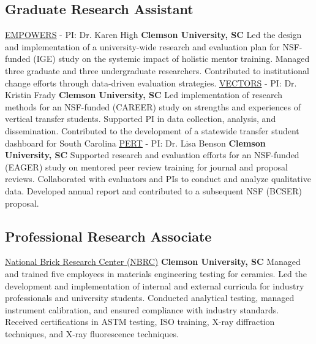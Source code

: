 
\subsection{Graduate Research Assistant}
\begin{cvtable}
        {\color{cvsectioncolor}\href{https://www.nsf.gov/awardsearch/showAward?AWD_ID=2429719&HistoricalAwards=false}{\underline{EMPOWERS}} - PI: Dr. Karen High}
        {\textbf{Clemson University, SC}}
        {Led the design and implementation of a university-wide research and evaluation plan for NSF-funded (IGE) study on the systemic impact of holistic mentor training. Managed three graduate and three undergraduate researchers. Contributed to institutional change efforts through data-driven evaluation strategies.}
        {\color{cvsectioncolor}\href{https://www.nsf.gov/awardsearch/showAward?AWD_ID=2144213&HistoricalAwards=false}{\underline{VECTORS}} - PI: Dr. Kristin Frady}
        {\textbf{Clemson University, SC}}
        {Led implementation of research methods for an NSF-funded (CAREER) study on strengths and experiences of vertical transfer students. Supported PI in data collection, analysis, and dissemination. Contributed to the development of a statewide transfer student dashboard for South Carolina}
        {\color{cvsectioncolor}\href{https://www.nsf.gov/awardsearch/showAward?AWD_ID=2037807&HistoricalAwards=false}{\underline{PERT}} - PI: Dr. Lisa Benson}
        {\textbf{Clemson University, SC}}
        {Supported research and evaluation efforts for an NSF-funded (EAGER) study on mentored peer review training for journal and proposal reviews. Collaborated with evaluators and PIs to conduct and analyze qualitative data. Developed annual report and contributed to a subsequent NSF (BCSER) proposal.}
\end{cvtable}

\subsection{Professional Research Associate}
\begin{cvtable}
        {\color{cvsectioncolor}\href{https://brickandtile.org/}{\underline{National Brick Research Center} (NBRC)}}
        {\textbf{Clemson University, SC}}
        {Managed and trained five employees in materials engineering testing for ceramics. Led the development and implementation of internal and external curricula for industry professionals and university students. Conducted analytical testing, managed instrument calibration, and ensured compliance with industry standards. Received certifications in ASTM testing, ISO training, X-ray diffraction techniques, and X-ray fluorescence techniques.}
\end{cvtable}